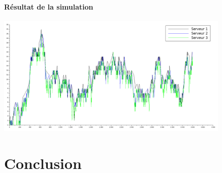 \documentclass{article}
\begin{document}
\paragraph{Résultat de la simulation}
\begin{center}
	\includegraphics[width=425px]{img/choix.png}
\end{center}

\section{Conclusion}
\paragraph{}

\newpage
\appendix

%
%
\end{document}
